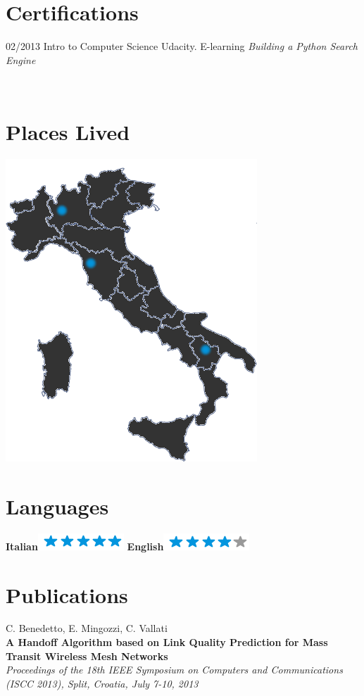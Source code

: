 \documentclass[]{friggeri-cv}
\begin{document}
\section{Certifications}
\begin{entrylist}
  \entry
    {02/2013}
    {Intro to Computer Science}
    {Udacity. E-learning}
    {\emph{Building a Python Search Engine}}
\end{entrylist}

\newpage

\begin{aside}
~
~
~
  \section{Places Lived}
    \includegraphics[scale=0.25]{img/italia.png}
    ~
  \section{Languages}
    \textbf{Italian}\includegraphics[scale=0.40]{img/5stars.png}
    \textbf{English}\includegraphics[scale=0.40]{img/4stars.png}
\end{aside}

\section{Publications}
C. Benedetto, E. Mingozzi, C. Vallati\\
\textbf{A Handoff Algorithm based on Link Quality Prediction for Mass Transit Wireless Mesh Networks}\\
\emph{Proceedings of the 18th IEEE Symposium on Computers and Communications (ISCC 2013), Split, Croatia, July 7-10, 2013}
\\
\end{document}
